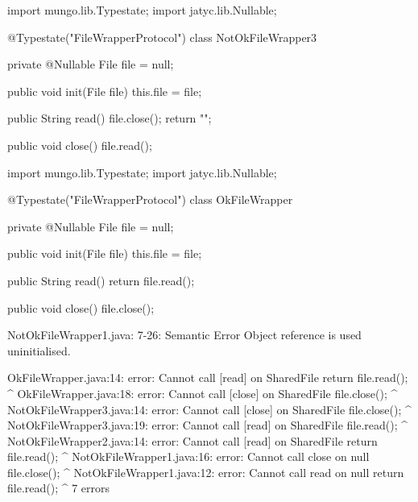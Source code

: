 \begin{code}
import mungo.lib.Typestate;
import jatyc.lib.Nullable;

@Typestate("FileWrapperProtocol")
class NotOkFileWrapper3 {

  private @Nullable File file = null;

  public void init(File file) {
    this.file = file;
  }

  public String read() {
    file.close();
    return "";
  }

  public void close() {
    file.read();
  }

}\end{code}

\begin{code}
import mungo.lib.Typestate;
import jatyc.lib.Nullable;

@Typestate("FileWrapperProtocol")
class OkFileWrapper {

  private @Nullable File file = null;

  public void init(File file) {
    this.file = file;
  }

  public String read() {
    return file.read();
  }

  public void close() {
    file.close();
  }

}\end{code}

\lstset{language=,caption=Mungo's output}
\begin{code}

NotOkFileWrapper1.java: 7-26: Semantic Error
		Object reference is used uninitialised.
\end{code}

\lstset{language=,caption=Our tool's output}
\begin{code}
OkFileWrapper.java:14: error: Cannot call [read] on Shared{File}
    return file.read();
                    ^
OkFileWrapper.java:18: error: Cannot call [close] on Shared{File}
    file.close();
              ^
NotOkFileWrapper3.java:14: error: Cannot call [close] on Shared{File}
    file.close();
              ^
NotOkFileWrapper3.java:19: error: Cannot call [read] on Shared{File}
    file.read();
             ^
NotOkFileWrapper2.java:14: error: Cannot call [read] on Shared{File}
    return file.read();
                    ^
NotOkFileWrapper1.java:16: error: Cannot call close on null
    file.close();
        ^
NotOkFileWrapper1.java:12: error: Cannot call read on null
    return file.read();
               ^
7 errors
\end{code}

